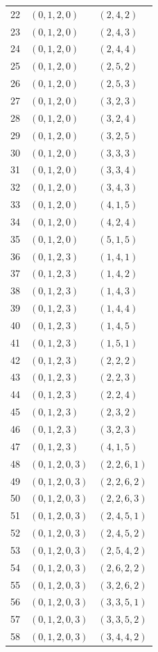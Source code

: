 \documentclass[11pt,a4paper]{article}
\theoremstyle{definition}
\theoremstyle{remark}
\begin{document}
\begin{longtable}{rll}
22 & $(0,1,2,0)$ & $(2,4,2)$\\
23 & $(0,1,2,0)$ & $(2,4,3)$\\
24 & $(0,1,2,0)$ & $(2,4,4)$\\
25 & $(0,1,2,0)$ & $(2,5,2)$\\
26 & $(0,1,2,0)$ & $(2,5,3)$\\
27 & $(0,1,2,0)$ & $(3,2,3)$\\
28 & $(0,1,2,0)$ & $(3,2,4)$\\
29 & $(0,1,2,0)$ & $(3,2,5)$\\
30 & $(0,1,2,0)$ & $(3,3,3)$\\
31 & $(0,1,2,0)$ & $(3,3,4)$\\
32 & $(0,1,2,0)$ & $(3,4,3)$\\
33 & $(0,1,2,0)$ & $(4,1,5)$\\
34 & $(0,1,2,0)$ & $(4,2,4)$\\
35 & $(0,1,2,0)$ & $(5,1,5)$\\
36 & $(0,1,2,3)$ & $(1,4,1)$\\
37 & $(0,1,2,3)$ & $(1,4,2)$\\
38 & $(0,1,2,3)$ & $(1,4,3)$\\
39 & $(0,1,2,3)$ & $(1,4,4)$\\
40 & $(0,1,2,3)$ & $(1,4,5)$\\
41 & $(0,1,2,3)$ & $(1,5,1)$\\
42 & $(0,1,2,3)$ & $(2,2,2)$\\
43 & $(0,1,2,3)$ & $(2,2,3)$\\
44 & $(0,1,2,3)$ & $(2,2,4)$\\
45 & $(0,1,2,3)$ & $(2,3,2)$\\
46 & $(0,1,2,3)$ & $(3,2,3)$\\
47 & $(0,1,2,3)$ & $(4,1,5)$\\
48 & $(0,1,2,0,3)$ & $(2,2,6,1)$\\
49 & $(0,1,2,0,3)$ & $(2,2,6,2)$\\
50 & $(0,1,2,0,3)$ & $(2,2,6,3)$\\
51 & $(0,1,2,0,3)$ & $(2,4,5,1)$\\
52 & $(0,1,2,0,3)$ & $(2,4,5,2)$\\
53 & $(0,1,2,0,3)$ & $(2,5,4,2)$\\
54 & $(0,1,2,0,3)$ & $(2,6,2,2)$\\
55 & $(0,1,2,0,3)$ & $(3,2,6,2)$\\
56 & $(0,1,2,0,3)$ & $(3,3,5,1)$\\
57 & $(0,1,2,0,3)$ & $(3,3,5,2)$\\
58 & $(0,1,2,0,3)$ & $(3,4,4,2)$\\

\end{longtable}
\end{document}
